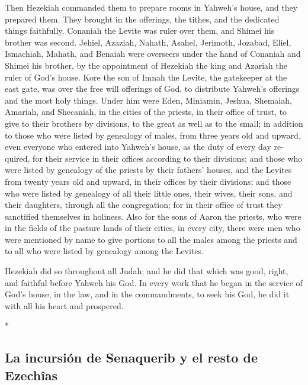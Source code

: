 \begin{paracol}{2}
\begin{otherlanguage}{english}
 Then Hezekiah commanded them to prepare rooms in
Yahweh's house, and they prepared them.  They brought in
the offerings, the tithes, and the dedicated things faithfully. Conaniah
the Levite was ruler over them, and Shimei his brother was second.
 Jehiel, Azaziah, Nahath, Asahel, Jerimoth, Jozabad,
Eliel, Ismachiah, Mahath, and Benaiah were overseers under the hand of
Conaniah and Shimei his brother, by the appointment of Hezekiah the king
and Azariah the ruler of God's house.  Kore the son of
Imnah the Levite, the gatekeeper at the east gate, was over the free
will offerings of God, to distribute Yahweh's offerings and the most
holy things.  Under him were Eden, Miniamin, Jeshua,
Shemaiah, Amariah, and Shecaniah, in the cities of the priests, in their
office of trust, to give to their brothers by divisions, to the great as
well as to the small;  in addition to those who were
listed by genealogy of males, from three years old and upward, even
everyone who entered into Yahweh's house, as the duty of every day
required, for their service in their offices according to their
divisions;  and those who were listed by genealogy of the
priests by their fathers' houses, and the Levites from twenty years old
and upward, in their offices by their divisions;  and
those who were listed by genealogy of all their little ones, their
wives, their sons, and their daughters, through all the congregation;
for in their office of trust they sanctified themselves in holiness.
 Also for the sons of Aaron the priests, who were in the
fields of the pasture lands of their cities, in every city, there were
men who were mentioned by name to give portions to all the males among
the priests and to all who were listed by genealogy among the Levites.

 Hezekiah did so throughout all Judah; and he did that
which was good, right, and faithful before Yahweh his God.
 In every work that he began in the service of God's
house, in the law, and in the commandments, to seek his God, he did it
with all his heart and prospered.

\end{otherlanguage}

\switchcolumn[0]*

\hypertarget{la-incursiuxf3n-de-senaquerib-y-el-resto-de-ezechuxeeas}{%
\subsection{La incursión de Senaquerib y el resto de
Ezechîas}\label{la-incursiuxf3n-de-senaquerib-y-el-resto-de-ezechuxeeas}}


\end{paracol}
